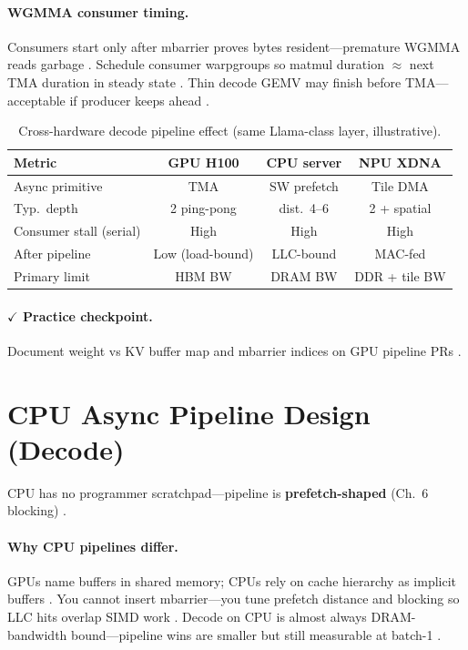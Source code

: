 \paragraph{WGMMA consumer timing.}
Consumers start only after mbarrier proves bytes resident---premature WGMMA reads garbage \citep{shah2024flashattention3,semianalysis2024tma}.
Schedule consumer warpgroups so matmul duration $\approx$ next TMA duration in steady state \citep{memoryfloor2026,yirage2026}.
Thin decode GEMV may finish before TMA---acceptable if producer keeps ahead \citep{patel2025llminference,taxbreak2026}.

\begin{table}[t]
\centering
\small
\caption{Cross-hardware decode pipeline effect (same Llama-class layer, illustrative).}
\label{tab:ch08_cross_hw_decode}
\begin{tabular}{@{}lccc@{}}
\toprule
\textbf{Metric} & \textbf{GPU H100} & \textbf{CPU server} & \textbf{NPU XDNA} \\
\midrule
Async primitive & TMA & SW prefetch & Tile DMA \\
Typ.\ depth & 2 ping-pong & dist.\ 4--6 & 2 + spatial \\
Consumer stall (serial) & High & High & High \\
After pipeline & Low (load-bound) & LLC-bound & MAC-fed \\
Primary limit & HBM BW & DRAM BW & DDR + tile BW \\
\bottomrule
\end{tabular}
\end{table}

\paragraph{$\checkmark$ Practice checkpoint.}
Document weight vs KV buffer map and mbarrier indices on GPU pipeline PRs \citep{shah2024flashattention3,yirage2026}.

\section{CPU Async Pipeline Design (Decode)}
\label{sec:ch08_cpu_dma}

CPU has no programmer scratchpad---pipeline is \textbf{prefetch-shaped} (Ch.~6 blocking) \citep{dlbook,patel2025llminference,chen2020compilerbasedhardw}.

\paragraph{Why CPU pipelines differ.}
GPUs name buffers in shared memory; CPUs rely on cache hierarchy as implicit buffers \citep{dlbook,nvidia2022hopper,semianalysis2024tma}.
You cannot insert mbarrier---you tune prefetch distance and blocking so LLC hits overlap SIMD work \citep{patel2025llminference,yirage2026,chen2020compilerbasedhardw}.
Decode on CPU is almost always DRAM-bandwidth bound---pipeline wins are smaller but still measurable at batch-1 \citep{memoryfloor2026,taxbreak2026,kwon2023vllm}.

